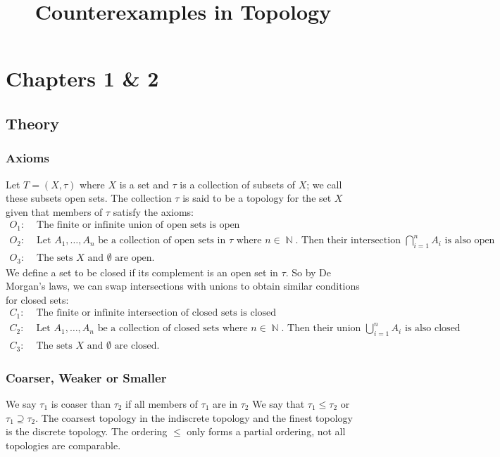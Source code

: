 \documentclass{article}
\title{Counterexamples in Topology}
\DeclareMathOperator\N{\mathbb{N}}
\begin{document}
\maketitle{}
\newpage{}
\section{Chapters 1 \& 2}
\subsection{Theory}
\subsubsection{Axioms}
Let $T = (X, \tau)$ where $X$ is a set and $\tau$
is a collection of subsets of $X$; we call these subsets open sets. The collection
$\tau$ is said to be a topology for the set $X$ given that members of $\tau$ satisfy the axioms:
\begin{align*}
O_1: & \text{ The finite or infinite union of open sets is open} \\
O_2: & \text{ Let $A_1,\hdots,A_n$ be a
 collection of open sets in $\tau$ where $n \in \N$.
  Then their intersection $\bigcap_{i=1}^n A_i$ is also open} \\
O_3: & \text{ The sets $X$ and $\emptyset$ are open.}
\end{align*}
We define a set to be closed if its complement is an open set in $\tau$.
So by De Morgan's laws, we can swap intersections with unions to obtain
similar conditions for closed sets:
\begin{align*}
C_1: & \text{ The finite or infinite intersection of closed sets is closed} \\
C_2: & \text{ Let $A_1,\hdots,A_n$ be a
 collection of closed sets where $n \in \N$.
  Then their union $\bigcup_{i=1}^n A_i$ is also closed} \\
C_3: & \text{ The sets $X$ and $\emptyset$ are closed.}
\end{align*}
\subsubsection{Coarser, Weaker or Smaller}
We say $\tau_1$ is coaser than $\tau_2$ if all members of $\tau_1$ are in $\tau_2$
We say that $\tau_1 \leq \tau_2$ or $\tau_1 \supseteq \tau_2$. The coarsest topology in the indiscrete topology
and the finest topology is the discrete topology. The ordering $\leq$ only forms a partial ordering, not all topologies are comparable.
\end{document}
